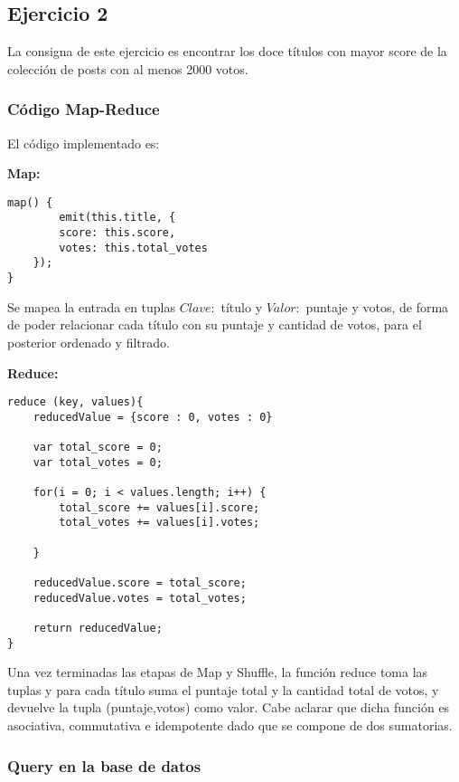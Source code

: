 \subsection{Ejercicio 2}

La consigna de este ejercicio es encontrar los doce t\'itulos con mayor score de la colecci\'on de posts con al menos 2000 votos.

\subsubsection{C\'odigo Map-Reduce}

El c\'odigo implementado es:

\textbf{Map:}

\begin{lstlisting}
map() {
		emit(this.title, {
    	score: this.score,
    	votes: this.total_votes
    });
}
\end{lstlisting}

Se mapea la entrada en tuplas $Clave:$ t\'itulo y $Valor:$ puntaje y votos, de forma de poder relacionar cada t\'itulo con su puntaje y cantidad de votos, para el posterior ordenado y filtrado.

\vspace{2mm}

\textbf{Reduce:}

\begin{lstlisting}
reduce (key, values){
	reducedValue = {score : 0, votes : 0}
	
	var total_score = 0;
	var total_votes = 0;

	for(i = 0; i < values.length; i++) {
		total_score += values[i].score;
		total_votes += values[i].votes;

	}

	reducedValue.score = total_score;
	reducedValue.votes = total_votes;

    return reducedValue;
}

\end{lstlisting}

Una vez terminadas las etapas de Map y Shuffle, la funci\'on reduce toma las tuplas y para cada t\'itulo suma el puntaje total y la cantidad total de votos, y devuelve la tupla (puntaje,votos) como valor. Cabe aclarar que dicha funci\'on es asociativa, commutativa e idempotente dado que se compone de dos sumatorias.

\vspace{2mm}

\subsubsection{Query en la base de datos}

